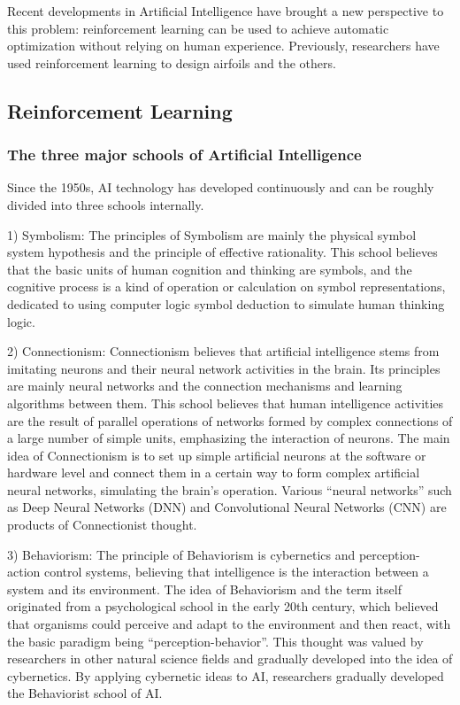 \documentclass{article}
\begin{document}
Recent developments in Artificial Intelligence have brought a new perspective to this problem: reinforcement learning can be used to achieve automatic optimization without relying on human experience.
Previously, researchers have used reinforcement learning to design airfoils and the others.

\subsection{Reinforcement Learning}\indent

\subsubsection{The three major schools of Artificial Intelligence}\indent

Since the 1950s, AI technology has developed continuously and can be roughly divided into three schools internally.

1) Symbolism: The principles of Symbolism are mainly the physical symbol system hypothesis and the principle of effective rationality.
This school believes that the basic units of human cognition and thinking are symbols, and the cognitive process is a kind of operation or calculation on symbol representations, dedicated to using computer logic symbol deduction to simulate human thinking logic.

2) Connectionism: Connectionism believes that artificial intelligence stems from imitating neurons and their neural network activities in the brain.
Its principles are mainly neural networks and the connection mechanisms and learning algorithms between them.
This school believes that human intelligence activities are the result of parallel operations of networks formed by complex connections of a large number of simple units,
emphasizing the interaction of neurons.
The main idea of Connectionism is to set up simple artificial neurons at the software or hardware level and connect them in a certain way to form complex artificial neural networks, simulating the brain's operation.
Various ``neural networks'' such as Deep Neural Networks (DNN) and Convolutional Neural Networks (CNN) are products of Connectionist thought.

3) Behaviorism: The principle of Behaviorism is cybernetics and perception-action control systems, believing that intelligence is the interaction between a system and its environment.
The idea of Behaviorism and the term itself originated from a psychological school in the early 20th century, which believed that organisms could perceive and adapt to the environment and then react, with the basic paradigm being ``perception-behavior''.
This thought was valued by researchers in other natural science fields and gradually developed into the idea of cybernetics.
By applying cybernetic ideas to AI, researchers gradually developed the Behaviorist school of AI.
\end{document}
